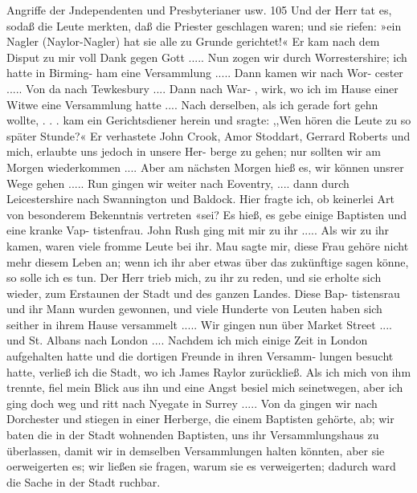 Angriffe der Jndependenten und Presbyterianer usw. 105
Und der Herr tat es, sodaß die Leute merkten, daß die Priester
geschlagen waren; und sie riefen: »ein Nagler (Naylor-Nagler)
hat sie alle zu Grunde gerichtet!« Er kam nach dem Disput zu
mir voll Dank gegen Gott .....
Nun zogen wir durch Worrestershire; ich hatte in Birming-
ham eine Versammlung ..... Dann kamen wir nach Wor-
cester ..... Von da nach Tewkesbury .... Dann nach War-
, wirk, wo ich im Hause einer Witwe eine Versammlung hatte ....
Nach derselben, als ich gerade fort gehn wollte, . . . kam ein
Gerichtsdiener herein und sragte: ,,Wen hören die Leute zu so
später Stunde?« Er verhastete John Crook, Amor Stoddart,
Gerrard Roberts und mich, erlaubte uns jedoch in unsere Her-
berge zu gehen; nur sollten wir am Morgen wiederkommen ....
Aber am nächsten Morgen hieß es, wir können unsrer Wege
gehen ..... Run gingen wir weiter nach Eoventry, ....
dann durch Leicestershire nach Swannington und Baldock. Hier
fragte ich, ob keinerlei Art von besonderem Bekenntnis vertreten
«sei? Es hieß, es gebe einige Baptisten und eine kranke Vap-
tistenfrau. John Rush ging mit mir zu ihr ..... Als wir zu
ihr kamen, waren viele fromme Leute bei ihr. Mau sagte mir,
diese Frau gehöre nicht mehr diesem Leben an; wenn ich ihr aber
etwas über das zukünftige sagen könne, so solle ich es tun. Der
Herr trieb mich, zu ihr zu reden, und sie erholte sich wieder,
zum Erstaunen der Stadt und des ganzen Landes. Diese Bap-
tistensrau und ihr Mann wurden gewonnen, und viele Hunderte
von Leuten haben sich seither in ihrem Hause versammelt .....
Wir gingen nun über Market Street .... und St. Albans
nach London .... Nachdem ich mich einige Zeit in London
aufgehalten hatte und die dortigen Freunde in ihren Versamm-
lungen besucht hatte, verließ ich die Stadt, wo ich James Raylor
zurückließ. Als ich mich von ihm trennte, fiel mein Blick aus
ihn und eine Angst besiel mich seinetwegen, aber ich ging doch
weg und ritt nach Nyegate in Surrey .....
Von da gingen wir nach Dorchester und stiegen in einer
Herberge, die einem Baptisten gehörte, ab; wir baten die in der
Stadt wohnenden Baptisten, uns ihr Versammlungshaus zu
überlassen, damit wir in demselben Versammlungen halten könnten,
aber sie oerweigerten es; wir ließen sie fragen, warum sie es
verweigerten; dadurch ward die Sache in der Stadt ruchbar.


